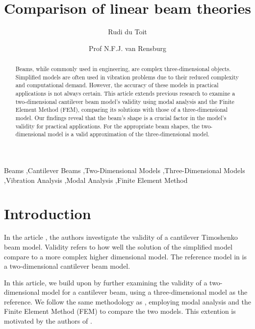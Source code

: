 
\usepackage{geometry}
\geometry{
  left=1.3in,
  right=1.4in,
  top=1.4in,
  bottom=1.4in,
}



\begin{frontmatter}

\title{Comparison of linear beam theories}

\author{Rudi du Toit}
\author{Prof N.F.J. van Rensburg}
\address{Department of Mathematics, University of Pretoria, Pretoria, South Africa}


\begin{abstract}
Beams, while commonly used in engineering, are complex three-dimensional objects. Simplified models are often used in vibration problems due to their reduced complexity and computational demand. However, the accuracy of these models in practical applications is not always certain. This article extends previous research to examine a two-dimensional cantilever beam model's validity using modal analysis and the Finite Element Method (FEM), comparing its solutions with those of a three-dimensional model. Our findings reveal that the beam's shape is a crucial factor in the model's validity for practical applications. For the appropriate beam shapes, the two-dimensional model is a valid approximation of the three-dimensional model. 
\end{abstract}

\begin{keyword}
	Beams \sep Cantilever Beams \sep Two-Dimensional Models \sep Three-Dimensional Models \sep Vibration Analysis \sep Modal Analysis \sep Finite Element Method
\end{keyword}

\end{frontmatter}

\section{Introduction}
In the article \cite{LVV09}, the authors investigate the validity of a cantilever Timoshenko beam model. Validity refers to how well the solution of the simplified model compare to a more complex higher dimensional model. The reference model in \cite{LVV09} is a two-dimensional cantilever beam model.

In this article, we build upon \cite{LVV09} by further examining the validity of a two-dimensional model for a cantilever beam, using a three-dimensional model as the reference. We follow the same methodology as \cite{LVV09}, employing modal analysis and the Finite Element Method (FEM) to compare the two models. This extention is motivated by the authors of \cite{LVV09}.

